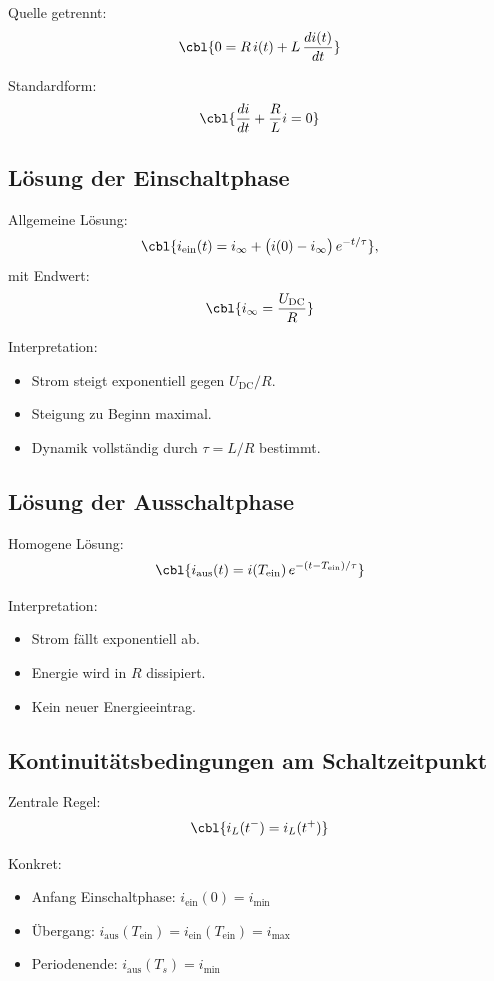 Quelle getrennt:
\[
\cbl{0 = R\,i(t) + L\,\frac{di(t)}{dt}}
\]

Standardform:
\[
\cbl{\frac{di}{dt} + \frac{R}{L} i = 0}
\]

\subsection{Lösung der Einschaltphase}

Allgemeine Lösung:
\[
\cbl{i_{\mathrm{ein}}(t) = i_\infty + \big(i(0) - i_\infty\big)\,e^{-t/\tau}},
\]
mit Endwert:
\[
\cbl{i_\infty = \frac{U_{\mathrm{DC}}}{R}}
\]

Interpretation:
\begin{itemize}
    \item Strom steigt exponentiell gegen $U_{\mathrm{DC}}/R$.
    \item Steigung zu Beginn maximal.
    \item Dynamik vollständig durch $\tau = L/R$ bestimmt.
\end{itemize}

\subsection{Lösung der Ausschaltphase}

Homogene Lösung:
\[
\cbl{i_{\mathrm{aus}}(t) = i(T_{\mathrm{ein}})\, e^{-(t-T_{\mathrm{ein}})/\tau}}
\]

Interpretation:
\begin{itemize}
    \item Strom fällt exponentiell ab.
    \item Energie wird in $R$ dissipiert.
    \item Kein neuer Energieeintrag.
\end{itemize}

\subsection{Kontinuitätsbedingungen am Schaltzeitpunkt}



Zentrale Regel:
\[
\cbl{i_L(t^-)=i_L(t^+)}
\]

Konkret:
\begin{itemize}
    \item Anfang Einschaltphase: $i_{\mathrm{ein}}(0)=i_{\min}$
    \item Übergang: $i_{\mathrm{aus}}(T_{\mathrm{ein}})=i_{\mathrm{ein}}(T_{\mathrm{ein}})=i_{\max}$
    \item Periodenende: $i_{\mathrm{aus}}(T_s)=i_{\min}$
\end{itemize}

